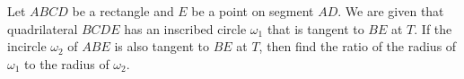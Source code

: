 Let $ABCD$ be a rectangle and $E$ be a point on segment $AD$. We are given that quadrilateral $BCDE$ has an inscribed circle $\omega_1$ that is tangent to $BE$ at $T$. If the incircle $\omega_2$ of $ABE$ is also tangent to $BE$ at $T$,  then find the ratio of the radius of $\omega_1$ to the radius of $\omega_2$.